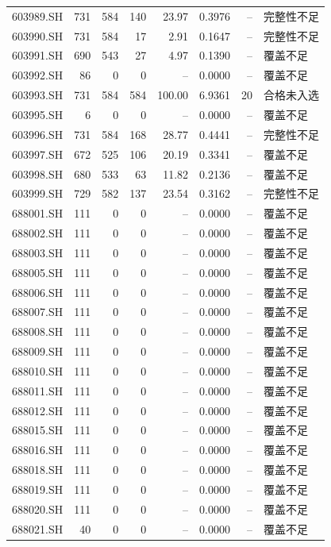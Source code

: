 \documentclass[10pt,a4paper]{article}
\begin{document}
\begin{longtable}{lrrr r r r l}
603989.SH & 731 & 584 & 140 & 23.97 & 0.3976 & -- & 完整性不足\\
603990.SH & 731 & 584 & 17 & 2.91 & 0.1647 & -- & 完整性不足\\
603991.SH & 690 & 543 & 27 & 4.97 & 0.1390 & -- & 覆盖不足\\
603992.SH & 86 & 0 & 0 & -- & 0.0000 & -- & 覆盖不足\\
603993.SH & 731 & 584 & 584 & 100.00 & 6.9361 & 20 & 合格未入选\\
603995.SH & 6 & 0 & 0 & -- & 0.0000 & -- & 覆盖不足\\
603996.SH & 731 & 584 & 168 & 28.77 & 0.4441 & -- & 完整性不足\\
603997.SH & 672 & 525 & 106 & 20.19 & 0.3341 & -- & 覆盖不足\\
603998.SH & 680 & 533 & 63 & 11.82 & 0.2136 & -- & 覆盖不足\\
603999.SH & 729 & 582 & 137 & 23.54 & 0.3162 & -- & 完整性不足\\
688001.SH & 111 & 0 & 0 & -- & 0.0000 & -- & 覆盖不足\\
688002.SH & 111 & 0 & 0 & -- & 0.0000 & -- & 覆盖不足\\
688003.SH & 111 & 0 & 0 & -- & 0.0000 & -- & 覆盖不足\\
688005.SH & 111 & 0 & 0 & -- & 0.0000 & -- & 覆盖不足\\
688006.SH & 111 & 0 & 0 & -- & 0.0000 & -- & 覆盖不足\\
688007.SH & 111 & 0 & 0 & -- & 0.0000 & -- & 覆盖不足\\
688008.SH & 111 & 0 & 0 & -- & 0.0000 & -- & 覆盖不足\\
688009.SH & 111 & 0 & 0 & -- & 0.0000 & -- & 覆盖不足\\
688010.SH & 111 & 0 & 0 & -- & 0.0000 & -- & 覆盖不足\\
688011.SH & 111 & 0 & 0 & -- & 0.0000 & -- & 覆盖不足\\
688012.SH & 111 & 0 & 0 & -- & 0.0000 & -- & 覆盖不足\\
688015.SH & 111 & 0 & 0 & -- & 0.0000 & -- & 覆盖不足\\
688016.SH & 111 & 0 & 0 & -- & 0.0000 & -- & 覆盖不足\\
688018.SH & 111 & 0 & 0 & -- & 0.0000 & -- & 覆盖不足\\
688019.SH & 111 & 0 & 0 & -- & 0.0000 & -- & 覆盖不足\\
688020.SH & 111 & 0 & 0 & -- & 0.0000 & -- & 覆盖不足\\
688021.SH & 40 & 0 & 0 & -- & 0.0000 & -- & 覆盖不足\\

\end{longtable}
\end{document}
